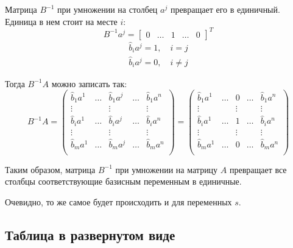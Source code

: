 \documentclass[a4paper,article,14pt]{extarticle}
\begin{document}
Матрица \(B^{-1}\) при умножении на столбец \(a^j\) превращает его в единичный.
Единица в нем стоит на месте \(i\):
\begin{equation}
    B^{-1}a^j = \begin{bmatrix}
        0 & \ldots & 1 & \ldots & 0
    \end{bmatrix} ^T
\end{equation}
\begin{equation}
    \begin{gathered}
        \hat b_i a^j = 1, \quad i = j \\
        \hat b_i a^j = 0, \quad i \ne j
    \end{gathered}
\end{equation}

Тогда \(B^{-1}A\) можно записать так:
\begin{equation}
    B^{-1}A =
    \begin{pmatrix}
        \hat b_1a^1 & \ldots & \hat b_1a^j & \ldots & \hat b_1a^n \\
        \vdots & & \vdots & & \vdots \\
        \hat b_ia^1 & \ldots & \hat b_ia^j & \ldots & \hat b_ia^n \\
        \vdots & & \vdots & & \vdots \\
        \hat b_ma^1 & \ldots & \hat b_ma^j & \ldots & \hat b_ma^n \\
    \end{pmatrix}
    =
    \begin{pmatrix}
        \hat b_1a^1 & \ldots & 0 & \ldots & \hat b_1a^n \\
        \vdots & & \vdots & & \vdots \\
        \hat b_ia^1 & \ldots & 1 & \ldots & \hat b_ia^n \\
        \vdots & & \vdots & & \vdots \\
        \hat b_ma^1 & \ldots & 0 & \ldots & \hat b_ma^n \\
    \end{pmatrix}
\end{equation}

Таким образом, матрица \(B^{-1}\) при умножении на матрицу \(A\) превращает все столбцы соответствующие базисным переменным в единичные.

Очевидно, то же самое будет происходить и для переменных \(s\).

\subsection{Таблица в развернутом виде}
\end{document}

